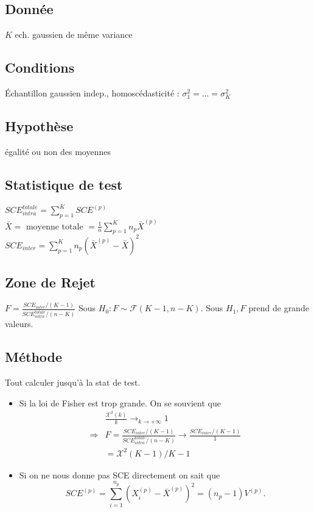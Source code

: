 \documentclass[9pt]{article}
\theoremstyle{plain}%
\theoremstyle{definition}
\theoremstyle{remark}
\begin{document}
\begin{multicols}{3}
\subsection*{Donnée}
$ K $ ech. gaussien de même variance

\subsection*{Conditions}
Échantillon gaussien indep., homoscédasticité : $ \sigma _1^2 = \dots = \sigma _K^2 $ 

\subsection*{Hypothèse}
égalité ou non des moyennes

\subsection*{Statistique de test}
$SCE^{totale}_{intra} = \sum_{p=1}^{K}SCE^{(p)}$ \\
$\bar{X} = \text{ moyenne totale } = \frac{1}{n}\sum_{p=1}^{K} n_p \bar{X}^{(p)}$ \\
$SCE_{inter} = \sum_{p=1}^{K} n_p (\bar{X}^{(p)} - \bar{X})^2$

\subsection*{Zone de Rejet}
$F = \frac{SCE_{inter} / (K-1)}{SCE_{intra}^{totale} / (n-K)}$
Sous $ H_0 : F \sim \mathcal{F}(K-1, n-K) $. Sous $ H_1, F $ prend de grande valeurs.

\subsection*{Méthode}
Tout calculer jusqu'à la stat de test. \begin{itemize}
    \item Si la loi de Fisher est trop grande. On se souvient que \begin{align*}
        &\frac{\mathcal{X}^2(k)}{k} \to _{k \to +\infty} 1 \\
        \Rightarrow & F = \frac{SCE_{inter} / (K-1)}{SCE_{intra}^{totale} / (n-K)} \to \frac{SCE_{inter} / (K-1)}{1} \\
        &= \mathcal{X}^2(K-1) / K-1
    \end{align*}
    \item Si on ne nous donne pas SCE directement on sait que
    \[
        SCE^{(p)} = \sum_{i=1}^{n_p} (X_i^{(p)} - \bar{X}^{(p)})^2 = (n_p -1) V^{(p)}
    .\]
\end{itemize}

\end{multicols}
\end{document}
